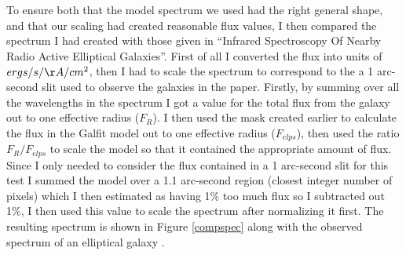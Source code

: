 \documentclass[11pt,twoside]{article}
\begin{document}
To ensure both that the model spectrum we used had the right general shape, and that our scaling had created reasonable flux values, I then compared the spectrum I had created with those given in ``Infrared Spectroscopy Of Nearby Radio Active Elliptical Galaxies''\cite{Mould}. First of all I converted the flux into units of $ergs/s/\AA/cm^2$, then I had to scale the spectrum to correspond to the a 1 arc-second slit used to observe the galaxies in the paper. Firstly, by summing over all the wavelengths in the spectrum I got a value for the total flux from the galaxy out to one effective radius ($F_R$). I then used the mask created earlier to calculate the flux in the Galfit model out to one effective radius ($F_{elps}$), then used the ratio $F_R/F_{elps}$ to scale the model so that it contained the appropriate amount of flux. Since I only needed to consider the flux contained in a 1 arc-second slit for this test I summed the model over a 1.1 arc-second region (closest integer number of pixels) which I then estimated as having 1\% too much flux so I subtracted out 1\%, I then used this value to scale the spectrum after normalizing it first. The resulting spectrum is shown in Figure \ref{compspec} along with the observed spectrum of an elliptical galaxy \cite{Mould}.
\end{document}
